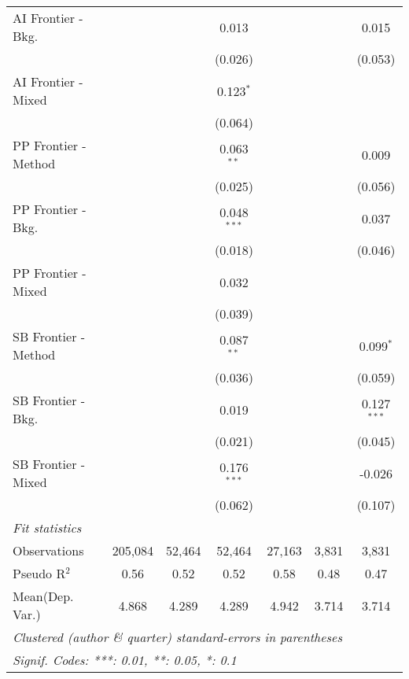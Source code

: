 \begin{tabular}{lcccccc}
   AI Frontier - Bkg.   &               &               & 0.013         &               &             & 0.015\\   
                        &               &               & (0.026)       &               &             & (0.053)\\   
   AI Frontier - Mixed  &               &               & 0.123$^{*}$   &               &             &   \\   
                        &               &               & (0.064)       &               &             &   \\   
   PP Frontier - Method &               &               & 0.063$^{**}$  &               &             & 0.009\\   
                        &               &               & (0.025)       &               &             & (0.056)\\   
   PP Frontier - Bkg.   &               &               & 0.048$^{***}$ &               &             & 0.037\\   
                        &               &               & (0.018)       &               &             & (0.046)\\   
   PP Frontier - Mixed  &               &               & 0.032         &               &             &   \\   
                        &               &               & (0.039)       &               &             &   \\   
   SB Frontier - Method &               &               & 0.087$^{**}$  &               &             & 0.099$^{*}$\\   
                        &               &               & (0.036)       &               &             & (0.059)\\   
   SB Frontier - Bkg.   &               &               & 0.019         &               &             & 0.127$^{***}$\\   
                        &               &               & (0.021)       &               &             & (0.045)\\   
   SB Frontier - Mixed  &               &               & 0.176$^{***}$ &               &             & -0.026\\   
                        &               &               & (0.062)       &               &             & (0.107)\\   
   \midrule
   \emph{Fit statistics}\\
   Observations         & 205,084       & 52,464        & 52,464        & 27,163        & 3,831       & 3,831\\  
   Pseudo R$^2$         & 0.56          & 0.52          & 0.52          & 0.58          & 0.48        & 0.47\\  
Mean(Dep. Var.) & 4.868 & 4.289 & 4.289 & 4.942 & 3.714 & 3.714 \\
   \midrule \midrule
   \multicolumn{7}{l}{\emph{Clustered (author \& quarter) standard-errors in parentheses}}\\
   \multicolumn{7}{l}{\emph{Signif. Codes: ***: 0.01, **: 0.05, *: 0.1}}\\
\end{tabular}
\par\endgroup
